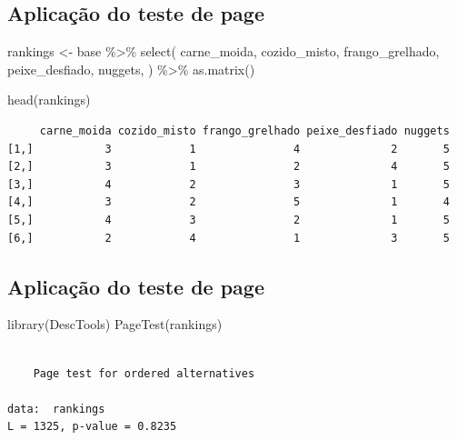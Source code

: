 \documentclass[
  letterpaper,
  DIV=11,
  numbers=noendperiod]{scrartcl}
\newenvironment{Shaded}{\begin{snugshade}}{\end{snugshade}}
\newcommand{\FunctionTok}[1]{\textcolor[rgb]{0.28,0.35,0.67}{#1}}
\newcommand{\NormalTok}[1]{\textcolor[rgb]{0.00,0.23,0.31}{#1}}
\newcommand{\OtherTok}[1]{\textcolor[rgb]{0.00,0.23,0.31}{#1}}
\newcommand{\SpecialCharTok}[1]{\textcolor[rgb]{0.37,0.37,0.37}{#1}}
\begin{document}
\subsection{Aplicação do teste de
page}\label{aplicauxe7uxe3o-do-teste-de-page}

\begin{Shaded}
\begin{Highlighting}[]
\NormalTok{rankings }\OtherTok{\textless{}{-}} 
\NormalTok{  base }\SpecialCharTok{\%\textgreater{}\%} 
  \FunctionTok{select}\NormalTok{(}
\NormalTok{    carne\_moida, }
\NormalTok{    cozido\_misto,}
\NormalTok{    frango\_grelhado, }
\NormalTok{    peixe\_desfiado,}
\NormalTok{    nuggets,}
\NormalTok{  ) }\SpecialCharTok{\%\textgreater{}\%} 
  \FunctionTok{as.matrix}\NormalTok{()}

\FunctionTok{head}\NormalTok{(rankings)}
\end{Highlighting}
\end{Shaded}

\begin{verbatim}
     carne_moida cozido_misto frango_grelhado peixe_desfiado nuggets
[1,]           3            1               4              2       5
[2,]           3            1               2              4       5
[3,]           4            2               3              1       5
[4,]           3            2               5              1       4
[5,]           4            3               2              1       5
[6,]           2            4               1              3       5
\end{verbatim}

\subsection{Aplicação do teste de
page}\label{aplicauxe7uxe3o-do-teste-de-page-1}

\begin{Shaded}
\begin{Highlighting}[]
\FunctionTok{library}\NormalTok{(DescTools)}
\FunctionTok{PageTest}\NormalTok{(rankings)}
\end{Highlighting}
\end{Shaded}

\begin{verbatim}

    Page test for ordered alternatives

data:  rankings
L = 1325, p-value = 0.8235
\end{verbatim}
\end{document}
